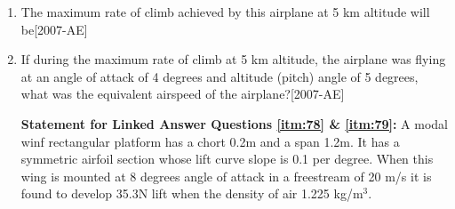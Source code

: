 \documentclass[journal]{IEEEtran}
\begin{document}
\begin{enumerate}
\begin{wrapfigure}
    \centering
    
\end{wrapfigure}
    \item The maximum rate of climb achieved by this airplane at 5 km altitude will be\label{itm:76}\hfill{[2007-AE]}
        \begin{enumerate}
        \end{enumerate}
    \item If during the maximum rate of climb at 5 km altitude, the airplane was flying at an angle of attack of 4 degrees and altitude (pitch) angle of 5 degrees, what was the equivalent airspeed of the airplane?\label{itm:77}\hfill{[2007-AE]}
        \begin{enumerate}
        \end{enumerate}

\textbf{Statement for Linked Answer Questions \ref{itm:78} \& \ref{itm:79}:} A modal winf rectangular platform has a chort 0.2m and a span 1.2m. It has a symmetric airfoil section whose lift curve slope is 0.1 per degree. When this wing is mounted at 8 degrees angle of attack in a freestream of 20 m/s it is found to develop 35.3N lift when the density of air 1.225 kg/m$^3$.


\end{enumerate}
\end{document}
